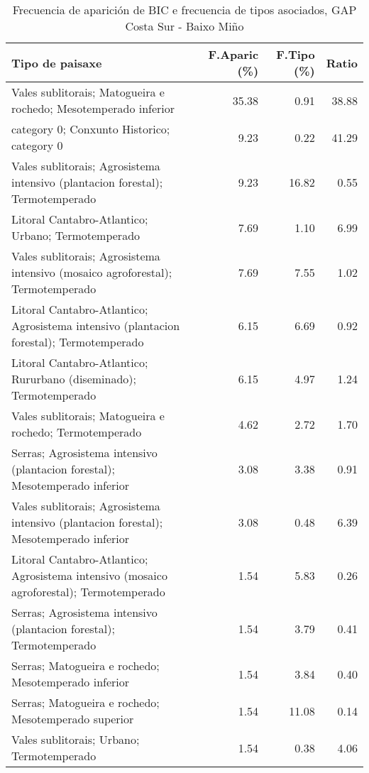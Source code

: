 \begin{table}[p]
\centering
\caption{Frecuencia de aparición de BIC e frecuencia de tipos asociados, GAP Costa Sur - Baixo Miño} 
\label{vbic3}
\begin{tabular}{lrrr}
  \hline
Tipo de paisaxe & F.Aparic (\%) & F.Tipo (\%) & Ratio \\ 
  \hline
Vales sublitorais; Matogueira e rochedo; Mesotemperado inferior & 35.38 & 0.91 & 38.88 \\ 
  category 0; Conxunto Historico; category 0 & 9.23 & 0.22 & 41.29 \\ 
  Vales sublitorais; Agrosistema intensivo (plantacion forestal); Termotemperado & 9.23 & 16.82 & 0.55 \\ 
  Litoral Cantabro-Atlantico; Urbano; Termotemperado & 7.69 & 1.10 & 6.99 \\ 
  Vales sublitorais; Agrosistema intensivo (mosaico agroforestal); Termotemperado & 7.69 & 7.55 & 1.02 \\ 
  Litoral Cantabro-Atlantico; Agrosistema intensivo (plantacion forestal); Termotemperado & 6.15 & 6.69 & 0.92 \\ 
  Litoral Cantabro-Atlantico; Rururbano (diseminado); Termotemperado & 6.15 & 4.97 & 1.24 \\ 
  Vales sublitorais; Matogueira e rochedo; Termotemperado & 4.62 & 2.72 & 1.70 \\ 
  Serras; Agrosistema intensivo (plantacion forestal); Mesotemperado inferior & 3.08 & 3.38 & 0.91 \\ 
  Vales sublitorais; Agrosistema intensivo (plantacion forestal); Mesotemperado inferior & 3.08 & 0.48 & 6.39 \\ 
  Litoral Cantabro-Atlantico; Agrosistema intensivo (mosaico agroforestal); Termotemperado & 1.54 & 5.83 & 0.26 \\ 
  Serras; Agrosistema intensivo (plantacion forestal); Termotemperado & 1.54 & 3.79 & 0.41 \\ 
  Serras; Matogueira e rochedo; Mesotemperado inferior & 1.54 & 3.84 & 0.40 \\ 
  Serras; Matogueira e rochedo; Mesotemperado superior & 1.54 & 11.08 & 0.14 \\ 
  Vales sublitorais; Urbano; Termotemperado & 1.54 & 0.38 & 4.06 \\ 
   \hline
\end{tabular}
\end{table}
